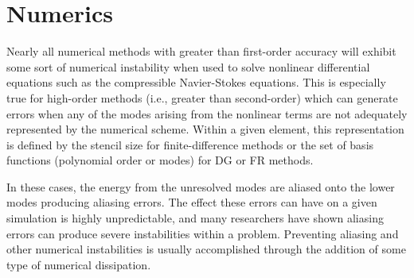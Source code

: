 \section{Numerics}
\label{SEC:Numerics}


Nearly all numerical methods with greater than first-order accuracy
will exhibit some sort of numerical instability when used to solve
nonlinear differential equations such as the compressible
Navier-Stokes equations.
%
This is especially true for high-order methods
(i.e., greater than second-order) which can generate errors
when any of the modes arising from the nonlinear terms are
not adequately represented by the numerical scheme.
%
Within a given element, this representation is defined by
the stencil size for finite-difference methods or
the set of basis functions (\thatis polynomial order or modes)
for DG or FR methods.


In these cases, the energy from the unresolved modes are aliased
onto the lower modes producing aliasing errors.
%
The effect these errors can have on a given simulation is
highly unpredictable, and many researchers have shown aliasing errors
can produce severe instabilities within a problem\cite{Kirby_2003, Kirby_2006,
Kopriva_2006, Hesthaven_2010, Castonguay_2011, Gassner_2013, Karniadakis_2013,
Williams_2013, Witherden_2014}.
%
Preventing aliasing and other numerical instabilities is usually
accomplished through the addition of some type of numerical dissipation.


